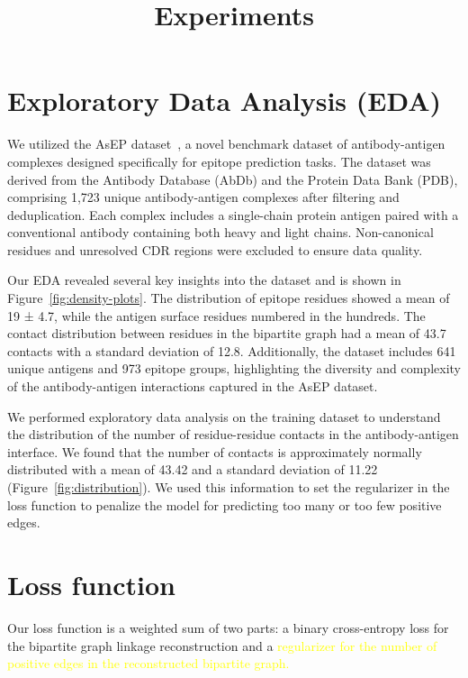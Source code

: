 \documentclass[11pt]{article}
\begin{document}
\title{Experiments}

\tableofcontents

\section*{Exploratory Data Analysis (EDA)}
We utilized the AsEP dataset~\cite{liu2024asep}, a novel benchmark dataset of antibody-antigen complexes designed specifically for epitope prediction tasks. 
The dataset was derived from the Antibody Database (AbDb) and the Protein Data Bank (PDB), comprising 1,723 unique antibody-antigen complexes after filtering and deduplication. 
Each complex includes a single-chain protein antigen paired with a conventional antibody containing both heavy and light chains. Non-canonical residues and unresolved CDR regions were excluded to ensure data quality. 


Our EDA revealed several key insights into the dataset and is shown in Figure~\ref{fig:density-plots}. 
The distribution of epitope residues showed a mean of 19 ± 4.7, while the antigen surface residues numbered in the hundreds. 
The contact distribution between residues in the bipartite graph had a mean of 43.7 contacts with a standard deviation of 12.8. 
Additionally, the dataset includes 641 unique antigens and 973 epitope groups, highlighting the diversity and complexity of the antibody-antigen interactions captured in the AsEP dataset.

We performed exploratory data analysis on the training dataset to understand the distribution of the number of residue-residue contacts in the antibody-antigen interface. 
We found that the number of contacts is approximately normally distributed with a mean of 43.42 and a standard deviation of 11.22 (Figure~\ref{fig:distribution}). 
We used this information to set the regularizer in the loss function to penalize the model for predicting too many or too few positive edges.




\section*{Loss function}
Our loss function is a weighted sum of two parts: a binary cross-entropy loss for the bipartite graph linkage reconstruction and a \textcolor{yellow}{regularizer for the number of positive edges in the reconstructed bipartite graph.}
\end{document}
